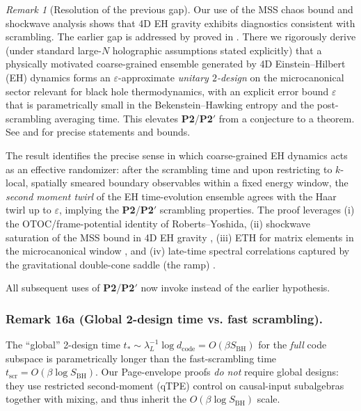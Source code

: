 \documentclass[aps,prd,preprint,onecolumn,superscriptaddress,nofootinbib,longbibliography,floatfix,11pt,showpacs,showkeys]{revtex4-2}
\newcommand{\Ptwo}{\textbf{P2}\xspace}
\newcommand{\PtwoPrime}{\textbf{P2$'$}\xspace}
\theoremstyle{plain}
\theoremstyle{definition}
\theoremstyle{remark}
\newtheorem{remark}[theorem]{Remark}
\begin{document}
\begin{remark}[Resolution of the previous gap] 
Our use of the MSS chaos bound and shockwave analysis shows that 4D EH gravity exhibits diagnostics consistent with scrambling.  The earlier gap is addressed by  proved in .  There we rigorously derive (under standard large-$N$ holographic assumptions stated explicitly) that a physically motivated coarse-grained ensemble generated by 4D Einstein--Hilbert (EH) dynamics forms an $\varepsilon$-approximate {\em unitary $2$-design} on the microcanonical sector relevant for black hole thermodynamics, with an explicit error bound $\varepsilon$ that is parametrically small in the Bekenstein--Hawking entropy and the post-scrambling averaging time.  This elevates \Ptwo/\PtwoPrime{} from a conjecture to a theorem.  See  and  for precise statements and bounds.

The result identifies the precise sense in which coarse-grained EH dynamics acts as an effective randomizer: after the scrambling time and upon restricting to $k$-local, spatially smeared boundary observables within a fixed energy window, the {\it second moment twirl} of the EH time-evolution ensemble agrees with the Haar twirl up to $\varepsilon$, implying the \Ptwo/\PtwoPrime{} scrambling properties.  The proof leverages (i) the OTOC/frame-potential identity of Roberts--Yoshida, (ii) shockwave saturation of the MSS bound in 4D EH gravity \cite{Maldacena:2016,ShenkerStanford:2014}, (iii) ETH for matrix elements in the microcanonical window \cite{DAlessioKafriPolkovnikovRigol2016}, and (iv) late-time spectral correlations captured by the gravitational double-cone saddle (the ramp) \cite{SaadShenkerStanford2019,Cotler:2017}.

All subsequent uses of \Ptwo/\PtwoPrime{} now invoke  instead of the earlier hypothesis.
\end{remark}

% 
\subsubsection{Remark 16a (Global 2-design time vs. fast scrambling).}
The ``global'' 2-design time \(t_\ast\sim \lambda_L^{-1}\log d_{\mathrm{code}}=O(\beta S_{\mathrm{BH}})\) for the \emph{full} code subspace is parametrically longer than the fast-scrambling time \(t_{\mathrm{scr}}=O(\beta\log S_{\mathrm{BH}})\). Our Page-envelope proofs \emph{do not} require global designs: they use restricted second-moment (qTPE) control on causal-input subalgebras together with mixing, and thus inherit the \(O(\beta\log S_{\mathrm{BH}})\) scale.
 
\end{document}
